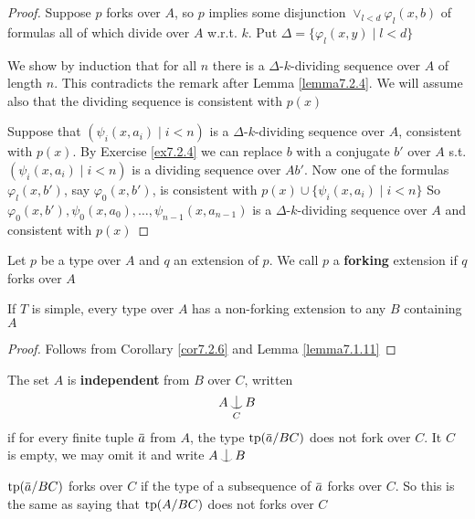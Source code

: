 \documentclass[11pt]{article}
\begin{document}
\begin{proof}
Suppose \(p\) forks over \(A\), so \(p\) implies some disjunction \(\vee_{l<d}\varphi_l(x,b)\) of
formulas all of which divide over \(A\) w.r.t. \(k\). Put \(\Delta=\{\varphi_l(x,y)\mid l<d\}\)

We show by induction that for all \(n\) there is a \(\Delta\)-\(k\)-dividing sequence over \(A\) of
length \(n\). This contradicts the remark after Lemma \ref{lemma7.2.4}. We will assume also that
the dividing sequence is consistent with \(p(x)\)

Suppose that \((\psi_i(x,a_i)\mid i<n)\) is a \(\Delta\)-\(k\)-dividing sequence over \(A\), consistent
with \(p(x)\). By Exercise \ref{ex7.2.4} we can replace \(b\) with a conjugate \(b'\) over \(A\)
s.t. \((\psi_i(x,a_i)\mid i<n)\) is a dividing sequence over \(Ab'\). Now one of the
formulas \(\varphi_l(x,b')\), say \(\varphi_0(x,b')\), is consistent with \(p(x)\cup\{\psi_i(x,a_i)\mid i<n\}\)
So \(\varphi_0(x,b'),\psi_0(x,a_0),\dots,\psi_{n-1}(x,a_{n-1})\) is a \(\Delta\)-\(k\)-dividing sequence over \(A\) and
consistent with \(p(x)\)
\end{proof}

Let \(p\) be a type over \(A\) and \(q\) an extension of \(p\). We call \(p\) a \textbf{forking}
extension if \(q\) forks over \(A\)

\begin{corollary}[Existence]
If \(T\) is simple, every type over \(A\) has a non-forking extension to any \(B\) containing \(A\)
\end{corollary}

\begin{proof}
Follows from Corollary \ref{cor7.2.6} and Lemma \ref{lemma7.1.11}
\end{proof}

\begin{definition}[]
The set \(A\) is \textbf{independent} from \(B\) over \(C\), written
\begin{equation*}
A\ind_CB
\end{equation*}
if for every finite tuple \(\bara\) from \(A\), the type \(\tp(\bara/BC)\) does not fork
over \(C\). It \(C\) is empty, we may omit it and write \(A\ind B\)
\end{definition}

\(\tp(\bara/BC)\) forks over \(C\) if the type of a subsequence of \(\bara\) forks over \(C\).
So this is the same as saying that \(\operatorname{tp}(A/BC)\) does not forks over \(C\)
\end{document}
